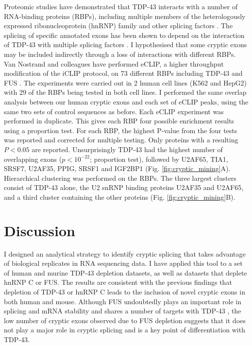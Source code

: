 Proteomic studies have demonstrated that TDP-43 interacts with a number of RNA-binding proteins (RBPs), including multiple members of the heterologously expressed ribonucleoprotein (hnRNP) family and other splicing factors \citep{Blokhuis2016-hw,Ling2010-sr,Freibaum2010-hw}. The splicing of specific annotated exons has been shown to depend on the interaction of TDP-43 with multiple splicing factors \citep{Mohagheghi2016}.  I hypothesised that some cryptic exons may be included indirectly through a loss of interactions with different RBPs. Van Nostrand and colleagues have performed eCLIP, a higher throughput modification of the iCLIP protocol, on 73 different RBPs including TDP-43 and FUS \citep{Van_Nostrand2016-su}. The experiments were carried out in 2 human cell lines (K562 and HepG2) with 29 of the RBPs being tested in both cell lines. I performed the same overlap analysis between our human cryptic exons and each set of eCLIP peaks, using the same two sets of control sequences as before. Each eCLIP experiment was performed in duplicate. This gives each RBP four possible enrichment results using a proportion test. For each RBP, the highest P-value from the four tests was reported and corrected for multiple testing. Only proteins with a resulting $P < 0.05$ are reported. Unsurprisingly TDP-43 had the highest number of overlapping exons ($p < 10^{-22}$; proportion test), followed by U2AF65, TIA1, SRSF7, U2AF35, PPIG, SRSF1 and IGF2BP1 (Fig. \ref{fig:cryptic_mining}A). Hierarchical clustering was performed on the RBPs. The three largest clusters consist  of TDP-43 alone, the U2 snRNP binding proteins U2AF35 and U2AF65, and a third cluster containing the other proteins (Fig. \ref{fig:cryptic_mining}B). 

\clearpage

\section{Discussion}
I designed an analytical strategy to identify cryptic splicing that takes advantage of biological replicates in RNA sequencing data. I have applied this tool to a set of human and murine TDP-43 depletion datasets, as well as datasets that deplete hnRNP C or FUS. The results are consistent with the previous findings that depletion of TDP-43 or hnRNP C leads to the inclusion of novel cryptic exons in both human and mouse. Although FUS undoubtedly plays an important role in splicing and mRNA stability and shares a number of targets with TDP-43 \citep{Lagier-Tourenne2012}, the low number of cryptic exons observed due to FUS depletion suggests that it does not play a major role in cryptic splicing and is a key point of differentiation with TDP-43.

